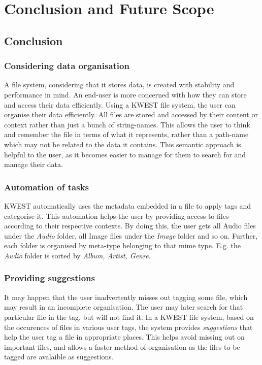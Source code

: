 \chapter{Conclusion and Future Scope}

\section{Conclusion}

\subsection*{Considering data organisation}
A file system, considering that it stores data, is created with stability and performance in mind. An end-user is more concerned with how they can store and access their data efficiently. Using a KWEST file system, the user can organise their data efficiently. All files are stored and accessed by their content or context rather than just a bunch of string-names. This allows the user to think and remember the file in terms of what it represents, rather than a path-name which may not be related to the data it contains. This semantic approach is helpful to the user, as it becomes easier to manage for them to search for and manage their data.

\subsection*{Automation of tasks}
KWEST automatically uses the metadata embedded in a file to apply tags and categorise it. This automation helps the user by providing access to files according to their respective contexts. By doing this, the user gets all Audio files under the \textit{Audio} folder, all Image files under the \textit{Image} folder and so on. Further, each folder is organised by meta-type belonging to that mime type. E.g. the \textit{Audio} folder is sorted by \textit{Album, Artist, Genre}.

\subsection*{Providing suggestions}
It may happen that the user inadvertently misses out tagging some file, which may result in an incomplete organisation. The user may later search for that particular file in the tag, but will not find it. In a KWEST file system, based on the occurences of files in various user tags, the system provides \textit{suggestions} that help the user tag a file in appropriate places. This helps avoid missing out on important files, and allows a faster method of organisation as the files to be tagged are avalaible as suggestions.

